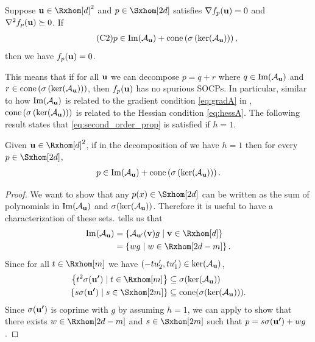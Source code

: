 \documentclass[final,onefignum,onetabnum]{siamart220329}
\begin{document}
\begin{proposition} \label{prop:second_order_property} Suppose
  $\vecp{u} \in \Rxhom[d]^2$ and $p \in \Sxhom[2d]$ satisfies
  $\nabla f_p(\boldsymbol{\mathbf{u}}) = 0$ and $\nabla^2 f_p(\boldsymbol{\mathbf{u}}) \succeq 0$. If
  \begin{align} \tag{C2}\label{eq:second_order_prop}
    p \in \operatorname{Im}(\mathcal{A}_{\boldsymbol{\mathbf{u}}}) + \operatorname{cone}\left( \sigma\left( \ker(\mathcal{A}_{\boldsymbol{\mathbf{u}}}) \right) \right),
  \end{align}
  then we have $f_p(\boldsymbol{\mathbf{u}}) = 0$.
\end{proposition}

This means that if for all $\boldsymbol{\mathbf{u}}$ we can decompose $p = q + r$ where
$q \in \operatorname{Im}(\mathcal{A}_{\boldsymbol{\mathbf{u}}})$ and $r \in \operatorname{cone}\left( \sigma\left( \ker(\mathcal{A}_{\boldsymbol{\mathbf{u}}}) \right) \right)$, then
$f_p(\boldsymbol{\mathbf{u}})$ has no spurious SOCPs. In particular, similar to how
$\operatorname{Im}(\mathcal{A}_{\boldsymbol{\mathbf{u}}})$ is related to the gradient condition \eqref{eq:gradA} in
, $\operatorname{cone}\left( \sigma\left( \ker(\mathcal{A}_{\boldsymbol{\mathbf{u}}}) \right) \right)$ is
related to the Hessian condition \eqref{eq:hessA}. The following result states
that \eqref{eq:second_order_prop} is satisfied if $h=1$.

\begin{lemma} \label{lem:imag_plus_cone} Given
  $\vecp{u} \in \Rxhom[d]^2$, if in the decomposition of
   we have $h=1$ then for every $p \in \Sxhom[2d]$,
  \begin{align*}
    p \in \operatorname{Im}(\mathcal{A}_{\boldsymbol{\mathbf{u}}}) + \operatorname{cone}\left( \sigma\left( \ker(\mathcal{A}_{\boldsymbol{\mathbf{u}}}) \right) \right).
  \end{align*}
\end{lemma}
\begin{proof}
  We want to show that any
  $p(x) \in \Sxhom[2d]$ can be written as the sum of polynomials in
  $\operatorname{Im}(\mathcal{A}_{\boldsymbol{\mathbf{u}}})$ and $\sigma(\ker(\mathcal{A}_{\boldsymbol{\mathbf{u}}}))$. Therefore it is useful to have a
  characterization of these sets.  tells us
  that
  \begin{align*}
    \imag(\Aup) &= \braces{\Aupp(\vecp{v}) g \mid \vecp{v} \in \Rxhom[d] } \\
                &= \braces{w g \mid w \in \Rxhom[2d-m]}.
  \end{align*}
  Since for all $t \in \Rxhom[m]$ we have
  $(-t u_2', t u_1') \in \ker(\mathcal{A}_{\boldsymbol{\mathbf{u}}})$,
  \begin{align}
    \notag
    \braces{t^2 \sig(\vecp{u'}) \mid t \in \Rxhom[m]} &\subseteq \sig(\ker(\Aup)) \\
    \label{eq:conesigker}
    \braces{s \sig(\vecp{u'}) \mid s \in \Sxhom[2m]} &\subseteq \cone(\sig(\ker(\Aup))).
  \end{align}
  Since $\sigma(\boldsymbol{\mathbf{u'}})$ is coprime with $g$ by assuming $h=1$, we can apply
   to show that there exists $w \in \Rxhom[2d-m]$ and
  $s \in \Sxhom[2m]$ such that $p = s \sigma(\boldsymbol{\mathbf{u'}}) + wg$.
\end{proof}
\end{document}
